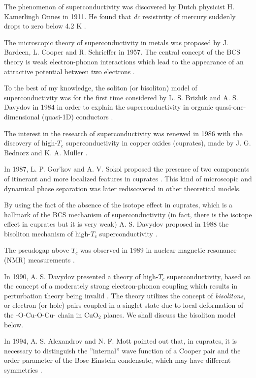 The phenomenon of superconductivity was discovered by Dutch physicist 
H. Kamerlingh Onnes in 1911. He found that {\em dc} resistivity
of mercury suddenly drops to zero below 4.2 K \cite{Onnes}.

The microscopic theory of superconductivity in metals was proposed by 
J. Bardeen, L. Cooper and R. Schrieffer in 1957. The central 
concept of the BCS theory is weak electron-phonon interactions 
which lead to the appearance of an attractive potential between two 
electrons \cite{BCS}. 

To the best of my knowledge, the soliton (or bisoliton) model of 
superconductivity was for the first time considered by L. S. Brizhik and 
A. S. Davydov in 1984 \cite{bisoliton} in order to explain the 
superconductivity in organic quasi-one-dimensional (quasi-1D) 
conductors \cite{Jerome}. 

The interest in the research of superconductivity was renewed in 1986 
with the discovery of high-$T_{c}$ superconductivity in copper oxides 
(cuprates), made by J. G. Bednorz and K. A. M\"{u}ller \cite{cuprates}.

In 1987, L. P. Gor'kov and A. V. Sokol proposed the presence 
of two components of itinerant and more localized features in cuprates
\cite{Gorkov}. This kind of microscopic and dynamical phase separation
was later  rediscovered in other theoretical models.

By using the fact of the absence of the isotope effect in cuprates, which
is a hallmark of the BCS mechanism of superconductivity (in fact, 
there is the isotope effect in cuprates but it is very weak) A. S. Davydov 
proposed in 1988 the bisoliton mechanism of high-$T_{c}$
superconductivity \cite{Davydov1}.

The pseudogap above $T_{c}$ \cite{Phillips} was observed in 1989 in nuclear 
magnetic resonance (NMR) measurements \cite{Warren}.

In 1990, A. S. Davydov presented a theory 
of high-$T_{c}$ superconductivity, based on the concept of a moderately 
strong electron-phonon coupling which results in perturbation theory being 
invalid \cite{Davydov2,Davydov3}. The theory  utilizes the concept of
{\em bisolitons}, or electron (or hole) pairs coupled in a singlet state due to 
local deformation of the -O-Cu-O-Cu- chain in CuO$_{2}$ planes. We shall 
discuss the bisoliton model below.

In 1994, A. S. Alexandrov and N. F. Mott pointed out that, 
in cuprates, it is necessary to distinguish the ''internal'' wave function 
of a Cooper pair and the order parameter of the Bose-Einstein
condensate, which may have different symmetries \cite{Sasha}.

